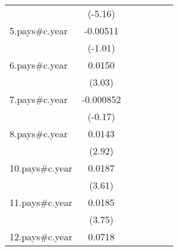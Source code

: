 {\begin{tabular}{l*{6}{c}}
                    &     (-5.16)         &                     &                     &                     &                     &                     \\
[1em]
5.pays#c.year       &    -0.00511         &                     &                     &                     &                     &                     \\
                    &     (-1.01)         &                     &                     &                     &                     &                     \\
[1em]
6.pays#c.year       &      0.0150\sym{**} &                     &                     &                     &                     &                     \\
                    &      (3.03)         &                     &                     &                     &                     &                     \\
[1em]
7.pays#c.year       &   -0.000852         &                     &                     &                     &                     &                     \\
                    &     (-0.17)         &                     &                     &                     &                     &                     \\
[1em]
8.pays#c.year       &      0.0143\sym{**} &                     &                     &                     &                     &                     \\
                    &      (2.92)         &                     &                     &                     &                     &                     \\
[1em]
10.pays#c.year      &      0.0187\sym{***}&                     &                     &                     &                     &                     \\
                    &      (3.61)         &                     &                     &                     &                     &                     \\
[1em]
11.pays#c.year      &      0.0185\sym{***}&                     &                     &                     &                     &                     \\
                    &      (3.75)         &                     &                     &                     &                     &                     \\
[1em]
12.pays#c.year      &      0.0718\sym{***}&                     &                     &                     &                     &                     \\

\end{tabular}}
